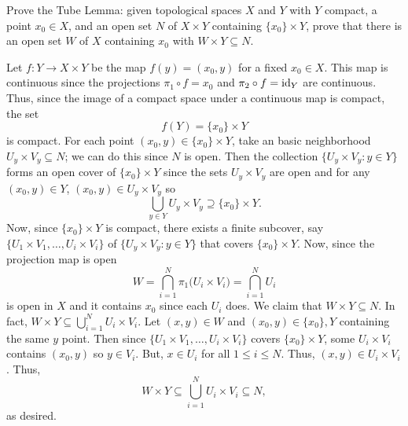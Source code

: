\begin{problem}
  Prove the Tube Lemma: given topological spaces \(X\) and \(Y\) with \(Y\)
  compact, a point \(x_0\in X\), and an open set \(N\) of \(X\times Y\)
  containing \(\{x_0\}\times Y\), prove that there is an open set \(W\) of
  \(X\) containing \(x_0\) with \(W\times Y\subseteq N\).
\end{problem}
\begin{solution}
  Let \(f\colon Y\to X\times Y\) be the map \(f(y)=(x_0,y)\) for a fixed
  \(x_0\in X\). This map is continuous since the projections
  \(\pi_1\circ f=x_0\) and \(\pi_2\circ f=\operatorname{id}_Y\) are continuous. Thus,
  since the image of a compact space under a continuous map is compact, the
  set
  \[
    f(Y)=\{x_0\}\times Y
  \]
  is compact. For each point \((x_0,y)\in \{x_0\}\times Y\), take an basic
  neighborhood \(U_y\times V_y\subseteq N\); we can do this since \(N\) is
  open. Then the collection \(\bigl\{U_y\times V_y:y\in Y\bigr\}\) forms an
  open cover of \(\{x_0\}\times Y\) since the sets \(U_y\times V_y\) are
  open and for any \((x_0,y)\in Y\), \((x_0,y)\in U_y\times V_y\) so
  \[
    \bigcup_{y\in Y}U_y\times V_y\supseteq \{x_0\}\times Y.
  \]
  Now, since \(\{x_0\}\times Y\) is compact, there exists a finite
  subcover, say \(\bigl\{U_1\times V_1,\dotsc,U_i\times V_i\bigr\}\) of
  \(\bigl\{U_y\times V_y:y\in Y\bigr\}\) that covers \(\{x_0\}\times
  Y\). Now, since the projection map is open
  \[
    W=\bigcap_{i=1}^N\pi_1\bigl(U_i\times V_i\bigr)=\bigcap_{i=1}^NU_i
  \]
  is open in \(X\) and it contains \(x_0\) since each \(U_i\) does. We
  claim that \(W\times Y\subseteq N\). In fact, \(W\times
  Y\subseteq\bigcup_{i=1}^N U_i\times V_i\). Let \((x,y)\in W\) and
  \((x_0,y)\in\{x_0\},Y\) containing the same \(y\) point. Then since
  \(\bigl\{U_1\times V_1,\dotsc,U_i\times V_i\bigr\}\) covers
  \(\{x_0\}\times Y\), some \(U_i\times V_i\) contains \((x_0,y)\) so
  \(y\in V_i\). But, \(x\in U_i\) for all \(1\leq i\leq N\). Thus,
  \((x,y)\in U_i\times V_i\). Thus,
  \[
    W\times Y\subseteq\bigcup_{i=1}^N U_i\times V_i\subseteq N,
  \]
  as desired.
\end{solution}

